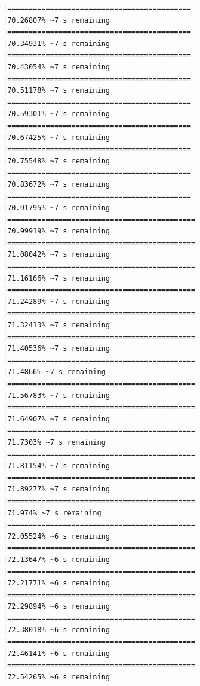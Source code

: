 \documentclass{article}\usepackage[]{graphicx}\usepackage[]{xcolor}
\makeatletter
\newenvironment{kframe}{%
 \def\at@end@of@kframe{}%
 \ifinner\ifhmode%
  \def\at@end@of@kframe{\end{minipage}}%
  \begin{minipage}{\columnwidth}%
 \fi\fi%
 \def\FrameCommand##1{\hskip\@totalleftmargin \hskip-\fboxsep
 \colorbox{shadecolor}{##1}\hskip-\fboxsep
     \hskip-\linewidth \hskip-\@totalleftmargin \hskip\columnwidth}%
 \MakeFramed {\advance\hsize-\width
   \@totalleftmargin\z@ \linewidth\hsize
   \@setminipage}}%
 {\par\unskip\endMakeFramed%
 \at@end@of@kframe}
\newenvironment{knitrout}{}{} %
\makeatother
\begin{document}
\begin{knitrout}
\begin{kframe}
\begin{verbatim}
|===========================================                   |70.26807% ~7 s remaining  
|===========================================                   |70.34931% ~7 s remaining  
|===========================================                   |70.43054% ~7 s remaining  
|===========================================                   |70.51178% ~7 s remaining  
|===========================================                   |70.59301% ~7 s remaining  
|===========================================                   |70.67425% ~7 s remaining  
|===========================================                   |70.75548% ~7 s remaining  
|===========================================                   |70.83672% ~7 s remaining  
|===========================================                   |70.91795% ~7 s remaining  
|============================================                  |70.99919% ~7 s remaining  
|============================================                  |71.08042% ~7 s remaining  
|============================================                  |71.16166% ~7 s remaining  
|============================================                  |71.24289% ~7 s remaining  
|============================================                  |71.32413% ~7 s remaining  
|============================================                  |71.40536% ~7 s remaining  
|============================================                  |71.4866% ~7 s remaining   
|============================================                  |71.56783% ~7 s remaining  
|============================================                  |71.64907% ~7 s remaining  
|============================================                  |71.7303% ~7 s remaining   
|============================================                  |71.81154% ~7 s remaining  
|============================================                  |71.89277% ~7 s remaining  
|============================================                  |71.974% ~7 s remaining    
|============================================                  |72.05524% ~6 s remaining  
|============================================                  |72.13647% ~6 s remaining  
|============================================                  |72.21771% ~6 s remaining  
|============================================                  |72.29894% ~6 s remaining  
|============================================                  |72.38018% ~6 s remaining  
|============================================                  |72.46141% ~6 s remaining  
|============================================                  |72.54265% ~6 s remaining  

\end{verbatim}
\end{kframe}
\end{knitrout}
\end{document}

